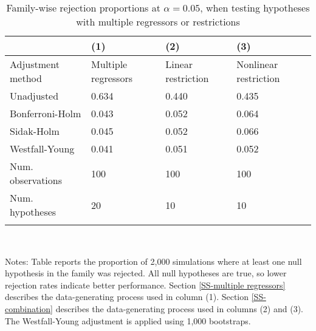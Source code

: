 \documentclass{article}
\begin{document}
\begin{table}[tbp] \centering
{}

\caption{Family-wise rejection proportions at \(\alpha = 0.05\), when testing hypotheses with multiple regressors or restrictions}
\label{tab:wyoung3}
\begin{tabularx}{\linewidth}{@{}lCCC@{}}

\toprule
&{(1)}&{(2)}&{(3)} \tabularnewline \midrule
{Adjustment method}&{Multiple regressors}&{Linear restriction}&{Nonlinear restriction} \tabularnewline
\midrule \addlinespace[\belowrulesep]
Unadjusted&0.634&0.440&0.435 \tabularnewline
Bonferroni-Holm&0.043&0.052&0.064 \tabularnewline
Sidak-Holm&0.045&0.052&0.066 \tabularnewline
Westfall-Young&0.041&0.051&0.052 \tabularnewline
\midrule Num. observations&100&100&100 \tabularnewline
Num. hypotheses&20&10&10 \tabularnewline
\bottomrule \addlinespace[\belowrulesep]

\end{tabularx}
\\ \parbox{\linewidth}{\footnotesize Notes: Table reports the proportion of 2,000 simulations where at least one null hypothesis in the family was rejected. All null hypotheses are true, so lower rejection rates indicate better performance. Section \ref{SS-multiple regressors} describes the data-generating process used in column (1). Section \ref{SS-combination} describes the data-generating process used in columns (2) and (3). The Westfall-Young adjustment is applied using 1,000 bootstraps.}
\end{table}
\end{document}
